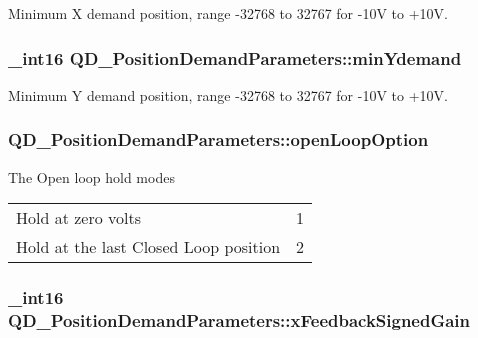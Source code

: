 Minimum X demand position, range -\/32768 to 32767 for -\/10V to +10V. 

\subsubsection[{\texorpdfstring{min\+Ydemand}{minYdemand}}]{\setlength{\rightskip}{0pt plus 5cm}\+\_\+int16 Q\+D\+\_\+\+Position\+Demand\+Parameters\+::min\+Ydemand}\hypertarget{struct_q_d___position_demand_parameters_a9fc6a17b0a4d60e8f6cb0cfe1342f083}{}\label{struct_q_d___position_demand_parameters_a9fc6a17b0a4d60e8f6cb0cfe1342f083}


Minimum Y demand position, range -\/32768 to 32767 for -\/10V to +10V. 

\subsubsection[{\texorpdfstring{open\+Loop\+Option}{openLoopOption}}]{ Q\+D\+\_\+\+Position\+Demand\+Parameters\+::open\+Loop\+Option}\hypertarget{struct_q_d___position_demand_parameters_ab15b99977db68066375cccee8df79a5c}{}\label{struct_q_d___position_demand_parameters_ab15b99977db68066375cccee8df79a5c}


The Open loop hold modes \tabulinesep=1mm
\begin{longtabu} spread 0pt [c]{*2{|X[-1]}|}
\hline
Hold at zero volts&1 \\
Hold at the last Closed Loop position&2 \\
\end{longtabu}


\subsubsection[{\texorpdfstring{x\+Feedback\+Signed\+Gain}{xFeedbackSignedGain}}]{\setlength{\rightskip}{0pt plus 5cm}\+\_\+int16 Q\+D\+\_\+\+Position\+Demand\+Parameters\+::x\+Feedback\+Signed\+Gain}\hypertarget{struct_q_d___position_demand_parameters_a96dcc5f4e7d7ff259491007b769b4f64}{}\label{struct_q_d___position_demand_parameters_a96dcc5f4e7d7ff259491007b769b4f64}


